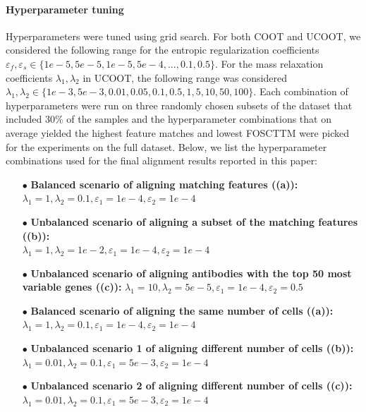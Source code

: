 \paragraph{Hyperparameter tuning} Hyperparameters were tuned using grid search.
For both COOT and UCOOT, we considered the following range for the entropic regularization
coefficients $\varepsilon_f, \varepsilon_s \in \{1e-5, 5e-5, 1e-5, 5e-4, ... ,0.1, 0.5\}$.
For the mass relaxation coefficients $\lambda_1, \lambda_2 $ in UCOOT, the following range
was considered $\lambda_1, \lambda_2 \in \{1e-3, 5e-3, 0.01, 0.05, 0.1, 0.5, 1, 5, 10, 50 ,100\}$.
Each combination of hyperparameters were run on three randomly chosen subsets of the dataset
that included 30\% of the samples and the hyperparameter combinations that on average yielded
the highest feature matches and lowest FOSCTTM were picked for the experiments on the full dataset.
Below, we list the hyperparameter combinations used for the final alignment results
reported in this paper:
\begin{itemize}
    \item[$\bullet$] \textbf{Balanced scenario of aligning matching features
    ((a)):} \\ $\lambda_1=1, \lambda_2=0.1, \varepsilon_1=1e-4, \varepsilon_2=1e-4$
    \item[$\bullet$] \textbf{Unbalanced scenario of aligning a subset of the matching features
    ((b)):} \\ $\lambda_1=1, \lambda_2=1e-2, \varepsilon_1=1e-4, \varepsilon_2=1e-4$
    \item[$\bullet$] \textbf{Unbalanced scenario of aligning antibodies with the top 50 most variable genes
    ((c)):}  $\lambda_1=10, \lambda_2=5e-5, \varepsilon_1=1e-4, \varepsilon_2=0.5$
    \item[$\bullet$] \textbf{Balanced scenario of aligning the same number of cells
    ((a)):} \\ $\lambda_1=1, \lambda_2=0.1, \varepsilon_1=1e-4, \varepsilon_2=1e-4$
    \item[$\bullet$] \textbf{Unbalanced scenario 1 of aligning different number of cells
    ((b)):} \\ $\lambda_1=0.01, \lambda_2=0.1, \varepsilon_1=5e-3, \varepsilon_2=1e-4$
    \item[$\bullet$] \textbf{Unbalanced scenario 2 of aligning different number of cells
    ((c)):} \\ $\lambda_1=0.01, \lambda_2=0.1, \varepsilon_1=5e-3, \varepsilon_2=1e-4$
\end{itemize}


